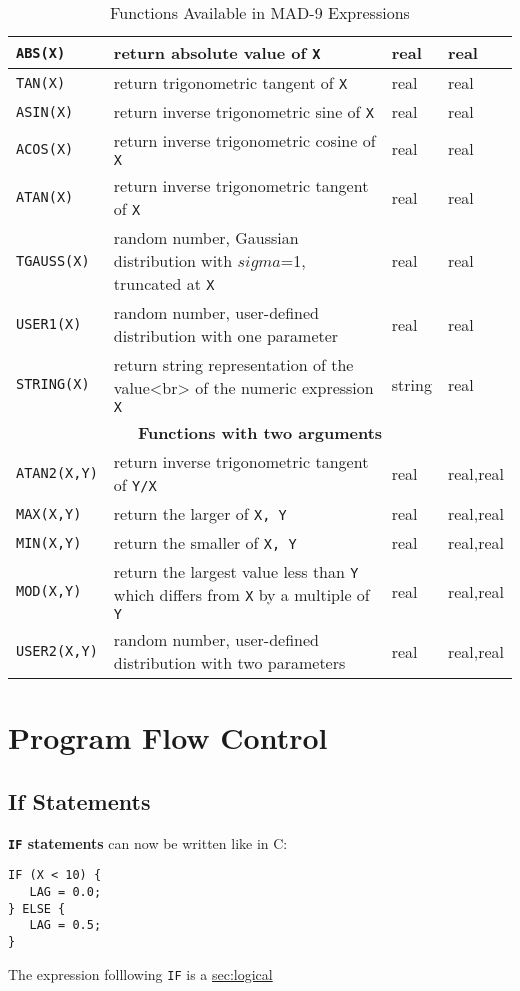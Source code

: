 \documentclass{article}
\newcommand{\secref}[2]{\hyperref{#1}{#1 (see Section~}{)}{sec:#2}}
\begin{document}
\begin{table}[ht]
\begin{center}
\begin{tabular}{|l|p{}|l|l|}
\hline
\texttt{ABS(X)} & return absolute value of \texttt{X} & real & real \\
\hline
\texttt{TAN(X)} & return trigonometric tangent of \texttt{X} & real & real \\
\hline
\texttt{ASIN(X)} & return inverse trigonometric sine of \texttt{X} &
real & real \\
\hline
\texttt{ACOS(X)} & return inverse trigonometric cosine of \texttt{X} &
real & real \\
\hline
\texttt{ATAN(X)} & return inverse trigonometric tangent of \texttt{X} &
real & real \\
\hline
\texttt{TGAUSS(X)} & random number, Gaussian distribution with $sigma$=1,
 truncated at \texttt{X} & real & real \\
\hline
\texttt{USER1(X)} & 
random number, user-defined distribution with one parameter &
real & real \\
\hline
\texttt{STRING(X)} &
return string representation of the value<br>
of the numeric expression \texttt{X} &
string & real \\
\hline
\multicolumn{4}{|c}{\textbf{Functions with two arguments}} \\
\hline
\texttt{ATAN2(X,Y)} & return inverse trigonometric tangent of \texttt{Y/X} &
real & real,real \\
\hline
\texttt{MAX(X,Y)} & return the larger of \texttt{X, Y} & real & real,real \\
\hline
\texttt{MIN(X,Y)} & return the smaller of \texttt{X, Y} & real & real,real \\
\hline
\texttt{MOD(X,Y)} & return the largest value less than \texttt{Y}
 which differs from \texttt{X} by a multiple of \texttt{Y} &
real & real,real \\
\hline
\texttt{USER2(X,Y)} & 
random number, user-defined distribution with two parameters &
real & real,real \\
\hline
\end{tabular}
\end{center}
\caption{Functions Available in MAD-9 Expressions}
\label{tab:functions}
\end{table}

\section{Program Flow Control}

\subsection{If Statements}
\textbf{\texttt{IF} statements} can now be written like in C:
\begin{verbatim}
IF (X < 10) {
   LAG = 0.0;
} ELSE {
   LAG = 0.5;
}
\end{verbatim}
The expression folllowing \texttt{IF} is a 
\secref{\texttt{<logical expression>}}{logical}
\end{document}
